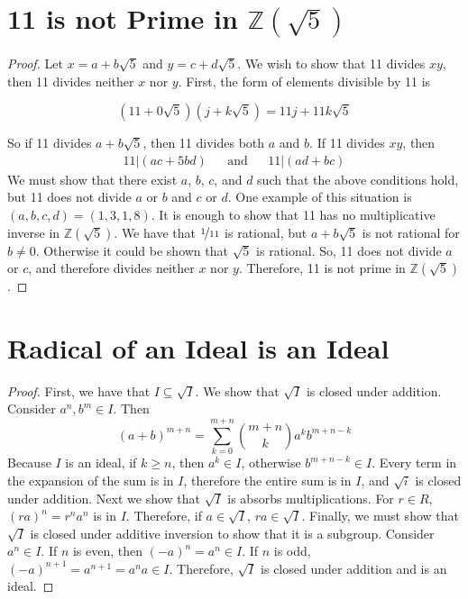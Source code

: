 \documentclass[12pt]{article}
\begin{document}
\section{11 is not Prime in $\mathbb{Z}(\sqrt{5})$}
\begin{proof}
Let $x = a + b\sqrt{5}$ and $y = c + d\sqrt{5}$. We wish to show that 11 divides $xy$, then 11 divides neither $x$ nor $y$. First, the form of elements divisible by 11 is

\[(11 + 0\sqrt{5})(j + k\sqrt{5}) = 11j + 11k\sqrt{5} \]

So if 11 divides $a + b\sqrt{5}$, then 11 divides both $a$ and $b$. If 11 divides $xy$, then
\begin{align*}
11 | (ac + 5bd) & &\text{and}& & 11 | (ad + bc)
\end{align*}
We must show that there exist $a$, $b$, $c$, and $d$ such that the above conditions hold, but 11 does not divide $a$ or $b$ and $c$ or $d$. One example of this situation is $(a, b, c, d) = (1,3,1,8)$.
It is enough to show that 11 has no multiplicative inverse in $\mathbb{Z}(\sqrt{5})$. We have that $\nicefrac{1}{11}$ is rational, but $a + b\sqrt{5}$ is not rational for $b \neq 0$. Otherwise it could be shown that $\sqrt{5}$ is rational. So, 11 does not divide $a$ or $c$, and therefore divides neither $x$ nor $y$. Therefore, 11 is not prime in $\mathbb{Z}(\sqrt{5})$.
\end{proof}

\section{Radical of an Ideal is an Ideal}
\begin{proof}
First, we have that $I \subseteq \sqrt{I}$. We show that $\sqrt{I}$ is closed under addition. Consider $a^n, b^m \in I$. Then
\[(a + b) ^ {m + n} = \sum_{k = 0} ^{m + n} \binom{m + n}{k} a^k b^{m + n - k}\]
Because $I$ is an ideal, if $k \geq n$, then $a^k \in I$, otherwise $b ^ {m + n - k} \in I$. Every term in the expansion of the sum is in $I$, therefore the entire sum is in $I$, and $\sqrt{i}$ is closed under addition. Next we show that $\sqrt{I}$ is absorbs multiplications. For $r \in R$, $(ra)^n = r^n a^n$ is in $I$. Therefore, if $a \in \sqrt{I}$, $ra \in \sqrt{I}$. Finally, we must show that $\sqrt{I}$ is closed under additive inversion to show that it is a subgroup. Consider $a^n \in I$. If $n$ is even, then $(-a)^n = a^n \in I$. If $n$ is odd, $(-a)^{n + 1} = a^{n + 1} = a^n a \in I$. Therefore, $\sqrt{I}$ is closed under addition and is an ideal.
\end{proof}
\end{document}
